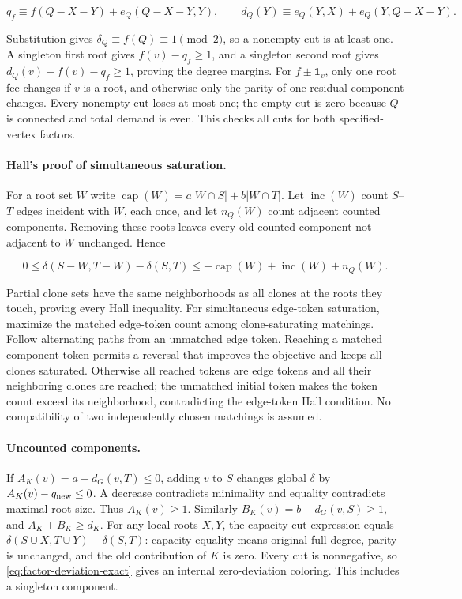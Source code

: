 \documentclass[11pt,a4paper]{article}
\theoremstyle{definition}
\begin{document}
\[
 q_f\equiv f(Q-X-Y)+e_Q(Q-X-Y,Y),\qquad
 d_Q(Y)\equiv e_Q(Y,X)+e_Q(Y,Q-X-Y).
\]

Substitution gives $\delta_Q\equiv f(Q)\equiv1\pmod2$, so a nonempty cut is at least one. A singleton first root gives $f(v)-q_f\ge1$, and a singleton second root gives $d_Q(v)-f(v)-q_f\ge1$, proving the degree margins. For $f\pm\mathbf1_v$, only one root fee changes if $v$ is a root, and otherwise only the parity of one residual component changes. Every nonempty cut loses at most one; the empty cut is zero because $Q$ is connected and total demand is even. This checks all cuts for both specified-vertex factors.

\paragraph{Hall's proof of simultaneous saturation.}
For a root set $W$ write $\operatorname{cap}(W)=a|W\cap S|+b|W\cap T|$. Let $\operatorname{inc}(W)$ count $S$--$T$ edges incident with $W$, each once, and let $n_Q(W)$ count adjacent counted components. Removing these roots leaves every old counted component not adjacent to $W$ unchanged. Hence

\[
 0\le\delta(S-W,T-W)-\delta(S,T)
 \le-\operatorname{cap}(W)+\operatorname{inc}(W)+n_Q(W).
\]

Partial clone sets have the same neighborhoods as all clones at the roots they touch, proving every Hall inequality. For simultaneous edge-token saturation, maximize the matched edge-token count among clone-saturating matchings. Follow alternating paths from an unmatched edge token. Reaching a matched component token permits a reversal that improves the objective and keeps all clones saturated. Otherwise all reached tokens are edge tokens and all their neighboring clones are reached; the unmatched initial token makes the token count exceed its neighborhood, contradicting the edge-token Hall condition. No compatibility of two independently chosen matchings is assumed.

\paragraph{Uncounted components.}
If $A_K(v)=a-d_G(v,T)\le0$, adding $v$ to $S$ changes global $\delta$ by $A_K(v)-q_{\rm new}\le0$. A decrease contradicts minimality and equality contradicts maximal root size. Thus $A_K(v)\ge1$. Similarly $B_K(v)=b-d_G(v,S)\ge1$, and $A_K+B_K\ge d_K$. For any local roots $X,Y$, the capacity cut expression equals $\delta(S\cup X,T\cup Y)-\delta(S,T)$: capacity equality means original full degree, parity is unchanged, and the old contribution of $K$ is zero. Every cut is nonnegative, so \eqref{eq:factor-deviation-exact} gives an internal zero-deviation coloring. This includes a singleton component.
\end{document}
